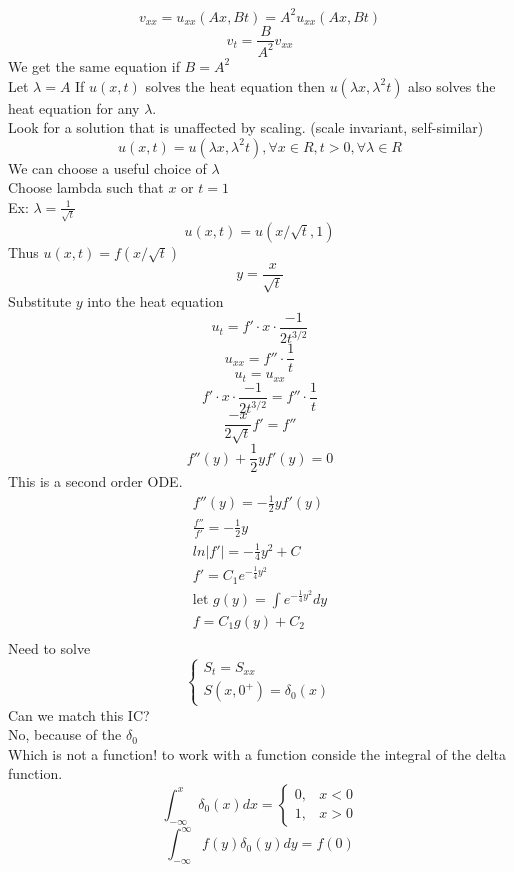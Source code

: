\documentclass{article}
\begin{document}
$$ v_{xx} = u_{xx}(Ax, Bt) = A^2 u_{xx}(Ax, Bt)$$
$$ v_t = \frac{B}{A^2} v_{xx}$$
We get the same equation if $B = A^2$\\
Let $\lambda = A$ 
If $u(x,t)$ solves the heat equation then $u(\lambda x, \lambda^2 t)$ also solves the heat equation for any $\lambda$.\\
Look for a solution that is unaffected by scaling. (scale invariant, self-similar)\\
$$ u(x,t) = u(\lambda x, \lambda^2 t), \forall x \in R, t >0, \forall \lambda \in R$$
We can choose a useful choice of $\lambda$\\
Choose lambda such that $x \text{ or } t = 1$\\
Ex: $\lambda = \frac{1}{\sqrt{t}}$\\
$$ u(x,t) = u(x/\sqrt{t}, 1)$$
Thus $u(x,t) = f(x/\sqrt{t})$\\
$$ y = \frac{x}{\sqrt{t}}$$
Substitute $y$ into the heat equation\\
$$ u_t = f' \cdot x \cdot \frac{-1}{2t^{3/2}}$$
$$ u_{xx} = f'' \cdot \frac{1}{t}$$
$$ u_t = u_{xx}$$
$$ f' \cdot x \cdot \frac{-1}{2t^{3/2}} = f'' \cdot \frac{1}{t}$$
$$ \frac{-x}{2\sqrt{t}} f' = f''$$
$$ f''(y) + \frac{1}{2}y f'(y) = 0$$
This is a second order ODE.\\
\begin{align*}
    f''(y) = -\frac{1}{2}y f'(y)\\
    \frac{f''}{f'} = -\frac{1}{2}y\\
    ln | f' | = -\frac{1}{4}y^2 + C\\
    f' = C_1e^{-\frac{1}{4}y^2}\\
    \text{let } g(y) = \int e^{-\frac{1}{4}y^2} dy\\
    f = C_1 g(y) + C_2\\
\end{align*}
Need to solve 
$$\begin{cases}
    S_t = S_{xx}\\
    S(x,0^+) = \delta_0(x)
\end{cases}
$$
Can we match this IC?\\
No, because of the $\delta_0$\\
Which is not a function! to work with a function conside the integral of the delta function.\\
$$ \int_{-\infty}^{x} \delta_0(x) dx = \begin{cases}
    0, & x < 0\\
    1, & x > 0
\end{cases}$$
$$ \int_{-\infty}^{\infty} f(y) \delta_0(y) dy = f(0)$$
\end{document}
